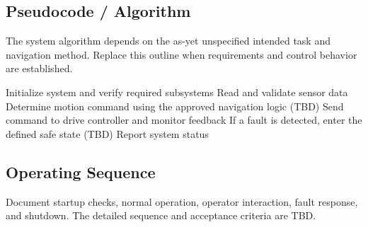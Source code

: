\subsection{Pseudocode / Algorithm}
The system algorithm depends on the as-yet unspecified intended task and navigation method. Replace this outline when requirements and control behavior are established.

\begin{algorithm}[H]
\caption{NaviBot operating sequence (outline)}
\label{alg:system_operation}
Initialize system and verify required subsystems\;
Read and validate sensor data\;
Determine motion command using the approved navigation logic (TBD)\;
Send command to drive controller and monitor feedback\;
If a fault is detected, enter the defined safe state (TBD)\;
Report system status\;
\end{algorithm}


\subsection{Operating Sequence}
Document startup checks, normal operation, operator interaction, fault response, and shutdown. The detailed sequence and acceptance criteria are TBD.
